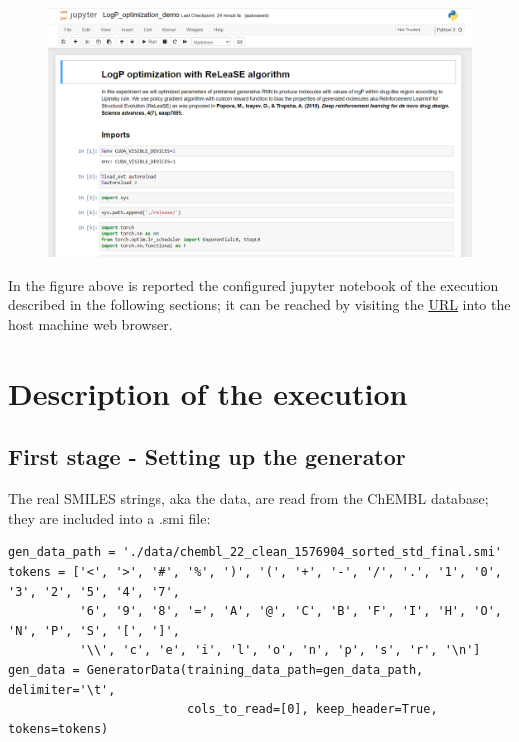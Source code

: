 \documentclass[a4paper]{article}
\begin{document}
\begin{figure}[htbp]
    \centering
        \includegraphics[width=\textwidth]{logp-optimization.png}
    \label{fig:logp-optimization}
\end{figure}

In the figure above is reported the configured jupyter notebook of the execution described in the following sections; it can be reached by visiting the \href{http://localhost:{HTTP_PORT}/LogP_optimization_demo.ipynb}{URL} into the host machine web browser.

\section{Description of the execution}\label{sec:Description of the execution}

\subsection{First stage - Setting up the generator}\label{sec:First stage - Setting up the generator}

The real SMILES strings, aka the data, are read from the ChEMBL database; they are included into a .smi file:

\begin{lstlisting}
gen_data_path = './data/chembl_22_clean_1576904_sorted_std_final.smi'
tokens = ['<', '>', '#', '%', ')', '(', '+', '-', '/', '.', '1', '0', '3', '2', '5', '4', '7',
          '6', '9', '8', '=', 'A', '@', 'C', 'B', 'F', 'I', 'H', 'O', 'N', 'P', 'S', '[', ']',
          '\\', 'c', 'e', 'i', 'l', 'o', 'n', 'p', 's', 'r', '\n']
gen_data = GeneratorData(training_data_path=gen_data_path, delimiter='\t', 
                         cols_to_read=[0], keep_header=True, tokens=tokens)
\end{lstlisting}
\end{document}
